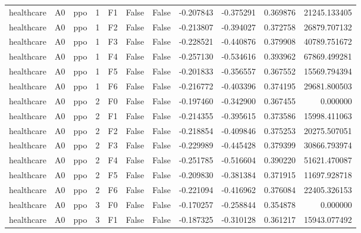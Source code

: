 \begin{tabular}{lllrlllrrrr}
healthcare &      A0 &       ppo &     1 &  F1 &           False &            False & -0.207843 & -0.375291 & 0.369876 &     21245.133405 \\
healthcare &      A0 &       ppo &     1 &  F2 &           False &            False & -0.213807 & -0.394027 & 0.372758 &     26879.707132 \\
healthcare &      A0 &       ppo &     1 &  F3 &           False &            False & -0.228521 & -0.440876 & 0.379908 &     40789.751672 \\
healthcare &      A0 &       ppo &     1 &  F4 &           False &            False & -0.257130 & -0.534616 & 0.393962 &     67869.499281 \\
healthcare &      A0 &       ppo &     1 &  F5 &           False &            False & -0.201833 & -0.356557 & 0.367552 &     15569.794394 \\
healthcare &      A0 &       ppo &     1 &  F6 &           False &            False & -0.216772 & -0.403396 & 0.374195 &     29681.800503 \\
healthcare &      A0 &       ppo &     2 &  F0 &           False &            False & -0.197460 & -0.342900 & 0.367455 &         0.000000 \\
healthcare &      A0 &       ppo &     2 &  F1 &           False &            False & -0.214355 & -0.395615 & 0.373586 &     15998.411063 \\
healthcare &      A0 &       ppo &     2 &  F2 &           False &            False & -0.218854 & -0.409846 & 0.375253 &     20275.507051 \\
healthcare &      A0 &       ppo &     2 &  F3 &           False &            False & -0.229989 & -0.445428 & 0.379399 &     30866.793974 \\
healthcare &      A0 &       ppo &     2 &  F4 &           False &            False & -0.251785 & -0.516604 & 0.390220 &     51621.470087 \\
healthcare &      A0 &       ppo &     2 &  F5 &           False &            False & -0.209830 & -0.381384 & 0.371915 &     11697.928718 \\
healthcare &      A0 &       ppo &     2 &  F6 &           False &            False & -0.221094 & -0.416962 & 0.376084 &     22405.326153 \\
healthcare &      A0 &       ppo &     3 &  F0 &           False &            False & -0.170257 & -0.258844 & 0.354878 &         0.000000 \\
healthcare &      A0 &       ppo &     3 &  F1 &           False &            False & -0.187325 & -0.310128 & 0.361217 &     15943.077492 \\

\end{tabular}
